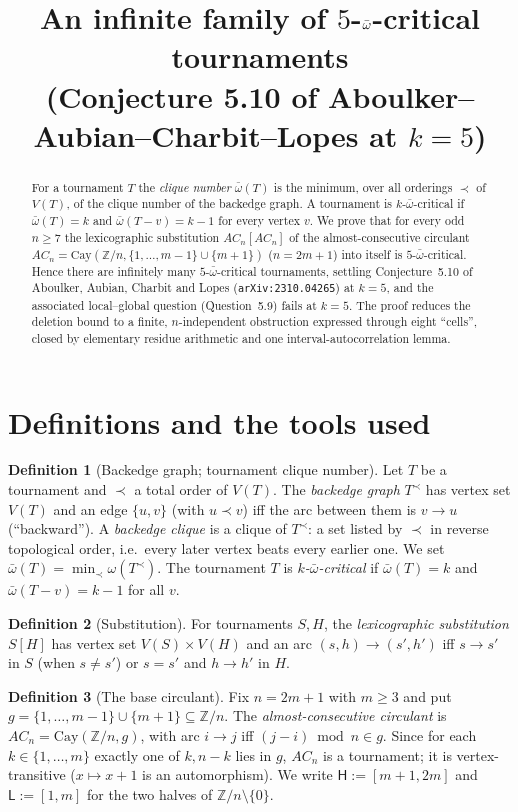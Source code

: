 \documentclass[11pt]{article}
\title{An infinite family of $5$-$\ob$-critical tournaments\\
\large (Conjecture 5.10 of Aboulker--Aubian--Charbit--Lopes at $k=5$)}
\author{}
\date{}
\newcommand{\ob}{\bar\omega}
\newcommand{\Z}{\mathbb{Z}}
\newcommand{\Hi}{\mathsf{H}}
\newcommand{\Lo}{\mathsf{L}}
\theoremstyle{plain}
\theoremstyle{definition}
\newtheorem{definition}{Definition}
\begin{document}
\maketitle

\begin{abstract}
For a tournament $T$ the \emph{clique number} $\ob(T)$ is the minimum, over all orderings
$\prec$ of $V(T)$, of the clique number of the backedge graph. A tournament is
$k$-$\ob$-critical if $\ob(T)=k$ and $\ob(T-v)=k-1$ for every vertex $v$. We prove that for
every odd $n\ge 7$ the lexicographic substitution $AC_n[AC_n]$ of the almost-consecutive
circulant $AC_n=\mathrm{Cay}(\Z/n,\{1,\dots,m-1\}\cup\{m+1\})$ ($n=2m+1$) into itself is
$5$-$\ob$-critical. Hence there are infinitely many $5$-$\ob$-critical tournaments, settling
Conjecture~5.10 of Aboulker, Aubian, Charbit and Lopes (\texttt{arXiv:2310.04265}) at $k=5$,
and the associated local--global question (Question~5.9) fails at $k=5$. The proof reduces the
deletion bound to a finite, $n$-independent obstruction expressed through eight ``cells'',
closed by elementary residue arithmetic and one interval-autocorrelation lemma.
\end{abstract}

\section{Definitions and the tools used}

\begin{definition}[Backedge graph; tournament clique number]
Let $T$ be a tournament and $\prec$ a total order of $V(T)$. The \emph{backedge graph} $T^{\prec}$
has vertex set $V(T)$ and an edge $\{u,v\}$ (with $u\prec v$) iff the arc between them is $v\to u$
(``backward''). A \emph{backedge clique} is a clique of $T^{\prec}$: a set listed by $\prec$ in
reverse topological order, i.e.\ every later vertex beats every earlier one. We set
$\ob(T)=\min_{\prec}\omega(T^{\prec})$. The tournament $T$ is \emph{$k$-$\ob$-critical} if
$\ob(T)=k$ and $\ob(T-v)=k-1$ for all $v$.
\end{definition}

\begin{definition}[Substitution]
For tournaments $S,H$, the \emph{lexicographic substitution} $S[H]$ has vertex set
$V(S)\times V(H)$ and an arc $(s,h)\to(s',h')$ iff $s\to s'$ in $S$ (when $s\ne s'$) or $s=s'$
and $h\to h'$ in $H$.
\end{definition}

\begin{definition}[The base circulant]
Fix $n=2m+1$ with $m\ge 3$ and put $g=\{1,\dots,m-1\}\cup\{m+1\}\subseteq\Z/n$. The
\emph{almost-consecutive circulant} is $AC_n=\mathrm{Cay}(\Z/n,g)$, with arc $i\to j$ iff
$(j-i)\bmod n\in g$. Since for each $k\in\{1,\dots,m\}$ exactly one of $k,n-k$ lies in $g$,
$AC_n$ is a tournament; it is vertex-transitive ($x\mapsto x+1$ is an automorphism). We write
$\Hi:=[m+1,2m]$ and $\Lo:=[1,m]$ for the two halves of $\Z/n\setminus\{0\}$.
\end{definition}
\end{document}
